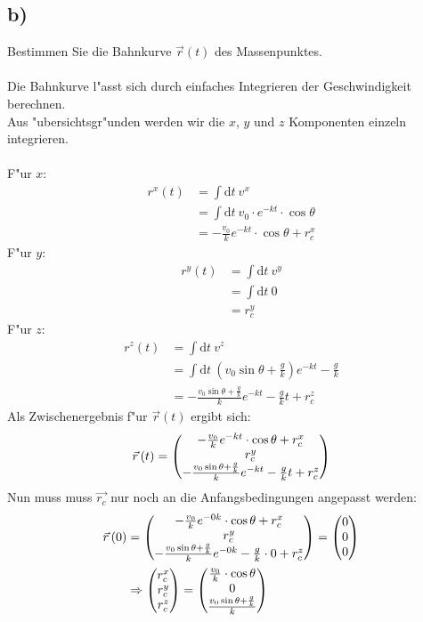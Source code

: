 \documentclass{theozettel}
\begin{document}
\subsection*{b)}Bestimmen Sie die Bahnkurve $\vec{r}\left(t\right)$ des Massenpunktes.\\\\
Die Bahnkurve l"asst sich durch einfaches Integrieren der Geschwindigkeit berechnen.\\
Aus "ubersichtsgr"unden werden wir die $x$, $y$ und $z$ Komponenten einzeln integrieren.\\\\
F"ur $x$:
\begin{align*}
r^x\left(t\right)&=\int\text{d}t \ v^x\\
&=\int\text{d}t \ v_0\cdot e^{-kt}\cdot \cos\theta\\
&=-\frac{v_0}{k} e^{-kt}\cdot \cos\theta+r_c^x
\end{align*}
F"ur $y$:
\begin{align*}
r^y\left(t\right)&=\int\text{d}t \ v^y\\
&=\int\text{d}t \ 0\\
&=r_c^y
\end{align*}
F"ur $z$:
\begin{align*}
r^z\left(t\right)&=\int\text{d}t \ v^z\\
&=\int\text{d}t \ \left(v_0\sin\theta +\frac{g}{k}\right)e^{-kt}-\frac{g}{k}\\
&=-\frac{v_0\sin\theta +\frac{g}{k}}{k}e^{-kt}-\frac{g}{k}t+r_c^z
\end{align*}
Als Zwischenergebnis f"ur $\vec{r}\left(t\right)$ ergibt sich:
\begin{align*}
\vec{r}\left(t\right)=\mqty(-\frac{v_0}{k} e^{-kt}\cdot \cos\theta+r_c^x \\ r_c^y \\ -\frac{v_0\sin\theta +\frac{g}{k}}{k}e^{-kt}-\frac{g}{k}t+r_c^z )
\end{align*}
Nun muss muss $\vec{r_c}$ nur noch an die Anfangsbedingungen angepasst werden:
\begin{align*}
\vec{r}\left(0\right)&=\mqty(-\frac{v_0}{k} e^{-0k}\cdot \cos\theta+r_c^x \\ r_c^y \\ -\frac{v_0\sin\theta +\frac{g}{k}}{k}e^{-0k}-\frac{g}{k}\cdot 0+r_c^z )=\mqty(0\\0\\0)\\
&\Rightarrow\mqty(r_c^x\\r_c^y\\r_c^z)=\mqty(\frac{v_0}{k}\cdot \cos\theta\\0\\\frac{v_0\sin\theta +\frac{g}{k}}{k})
\end{align*}
\end{document}
